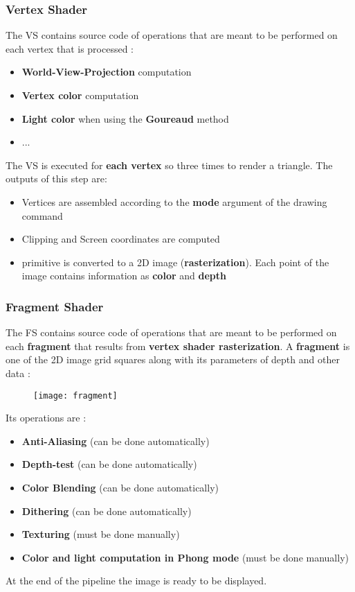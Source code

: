 \subsubsection{Vertex Shader}
The VS contains source code of operations that are meant to be performed on each
vertex that is processed :
\begin{itemize}
\item \textbf{World-View-Projection} computation
\item \textbf{Vertex color} computation
\item \textbf{Light color} when using the \textbf{Goureaud} method
\item ...
\end{itemize}
The VS is executed for \textbf{each vertex} so three times to render a triangle.
The outputs of this step are:
\begin{itemize}
\item Vertices are assembled according to the \textbf{mode} argument of the drawing command
\item Clipping and Screen coordinates are computed
\item primitive is converted to a 2D image (\textbf{rasterization}). Each point of the image contains information as \textbf{color} and \textbf{depth}
\end{itemize}

\subsubsection{Fragment Shader}
The FS contains source code of operations that are meant to be performed on each \textbf{fragment} that results from \textbf{vertex shader rasterization}.
A \textbf{fragment} is one of the 2D image grid squares along with its parameters of depth and other data :
 \begin{figure}[H]
 \centering
 \texttt{[image: fragment]} 
 \end{figure} 
Its operations are :
\begin{itemize}
\item \textbf{Anti-Aliasing} (can be done automatically)
\item \textbf{Depth-test} (can be done automatically)
\item \textbf{Color Blending} (can be done automatically)
\item \textbf{Dithering} (can be done automatically)
\item \textbf{Texturing} (must be done manually)
\item \textbf{Color and light computation in Phong mode} (must be done manually)
\end{itemize}
At the end of the pipeline the image is ready to be displayed.

